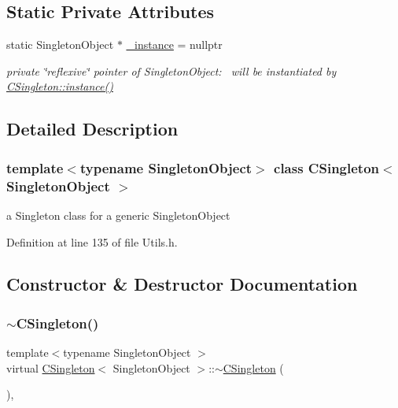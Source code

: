 \subsection*{Static Private Attributes}
\begin{DoxyCompactItemize}
\item 
static Singleton\+Object $\ast$ \hyperlink{classCSingleton_a690e0816be5d469e60d074cf8c5d139c}{\+\_\+instance} = nullptr
\begin{DoxyCompactList}\small\item\em private \char`\"{}reflexive\char`\"{} pointer of Singleton\+Object\+:~\newline
 will be instantiated by \hyperlink{classCSingleton_a58f5ac3aaaea8079a373350594726bdf}{C\+Singleton\+::instance()} \end{DoxyCompactList}\end{DoxyCompactItemize}


\subsection{Detailed Description}
\subsubsection*{template$<$typename Singleton\+Object$>$\newline
class C\+Singleton$<$ Singleton\+Object $>$}

a Singleton class for a generic Singleton\+Object 

Definition at line 135 of file Utils.\+h.



\subsection{Constructor \& Destructor Documentation}
\mbox{\label{classCSingleton_ad790e6c170b3e2da7fbb10873eeb882e}} 
\subsubsection{\texorpdfstring{$\sim$\+C\+Singleton()}{~CSingleton()}}
{\footnotesize\ttfamily template$<$typename Singleton\+Object $>$ \\
virtual \hyperlink{classCSingleton}{C\+Singleton}$<$ Singleton\+Object $>$\+::$\sim$\hyperlink{classCSingleton}{C\+Singleton} (\begin{DoxyParamCaption}{ }\end{DoxyParamCaption})\hspace{0.3cm}{\ttfamily [inline]}, {\ttfamily [virtual]}}



